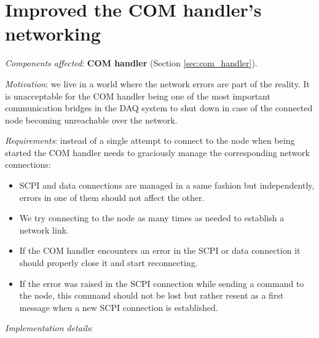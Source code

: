 \section{Improved the COM handler's networking}
\label{sec:com_handler_network_errors}

\textit{Components affected}: \textbf{COM handler} (Section \ref{sec:com_handler}).

\textit{Motivation}: we live in a world where the network errors are part of the reality. It is unacceptable for the COM handler being one of the most important communication bridges in the DAQ system to shut down in case of the connected node becoming unreachable over the network.

\textit{Requirements}: instead of a single attempt to connect to the node when being started the COM handler needs to graciously manage the corresponding network connections:

\begin{itemize}
	\item SCPI and data connections are managed in a same fashion but independently, errors in one of them should not affect the other.
	\item We try connecting to the node as many times as needed to establish a network link.
	\item If the COM handler encounters an error in the SCPI or data connection it should properly close it and start reconnecting.
	\item If the error was raised in the SCPI connection while sending a command to the node, this command should not be lost but rather resent as a first message when a new SCPI connection is established.
\end{itemize}

\textit{Implementation details}:

